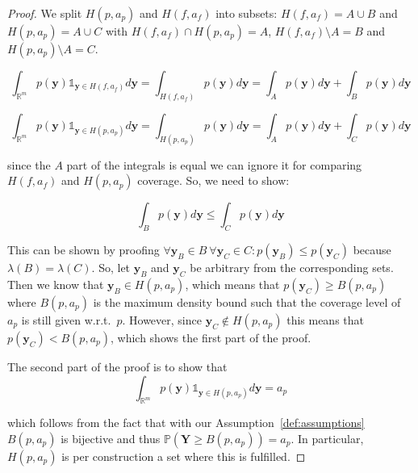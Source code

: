\begin{proof}
    We split $H(p,a_p)$ and $H(f, a_f)$ into subsets: $H(f, a_f) = A \cup B$ and $H(p, a_p) = A \cup C$ with $H(f, a_f) \cap H(p,a_p) = A$, $H(f, a_f)\setminus A = B$ and $H(p, a_p)\setminus A = C$.

    \begin{equation}
        \int_{\mathbb{R}^{m}} p(\mathbf{y}) \mathds1_{\mathbf{y} \in H(f, a_f)} d
        \mathbf{y} = \int_{H(f, a_f)} p(\mathbf{y}) d \mathbf{y} = \int_{A}
        p(\mathbf{y})
        d \mathbf{y} + \int_{B} p(\mathbf{y}) d \mathbf{y}
    \end{equation}

    \begin{equation}
        \int_{\mathbb{R}^{m}} p(\mathbf{y}) \mathds1_{\mathbf{y} \in H(p, a_p)} d
        \mathbf{y} = \int_{H(p, a_p)} p(\mathbf{y}) d \mathbf{y} = \int_{A}
        p(\mathbf{y})
        d \mathbf{y} + \int_{C} p(\mathbf{y}) d \mathbf{y}
    \end{equation}

    since the $A$ part of the integrals is equal we can ignore it for comparing $H(f, a_f)$ and $H(p, a_p)$ coverage. So, we need to show:

    \begin{equation}
        \int_{B} p(\mathbf{y}) d \mathbf{y} \leq \int_{C} p(\mathbf{y}) d
        \mathbf{y}
    \end{equation}

    This can be shown by proofing $\forall \mathbf{y}_B\in B\ \forall \mathbf{y}_C \in C: p(\mathbf{y}_B) \leq p(\mathbf{y}_C)$ because $\lambda(B) =  \lambda(C)$.
    So, let $\mathbf{y}_B$ and $\mathbf{y}_C$ be arbitrary from the corresponding sets. Then we know that $\mathbf{y}_B \in H(p,a_p)$, which means that $p(\mathbf{y}_C) \geq B(p, a_p)$ where $B(p, a_p)$ is the maximum density bound such that the coverage level of $a_p$ is still given w.r.t.\ $p$. However, since $\mathbf{y}_C \notin H(p,a_p)$ this means that $p(\mathbf{y}_C) < B(p, a_p)$, which shows the first part of the proof.

    The second part of the proof is to show that
    \begin{equation}
        \int_{\mathbb{R}^{m}} p(\mathbf{y}) \mathds1_{\mathbf{y} \in H(p, a_p)} d
        \mathbf{y} = a_p
    \end{equation}

    which follows from the fact that with our Assumption~\ref{def:assumptions} $B(p, a_p)$ is bijective and thus $\mathbb{P}(\mathbf{Y} \geq B(p, a_p)) = a_p$. In particular, $H(p, a_p)$ is per construction a set where this is fulfilled.
\end{proof}

